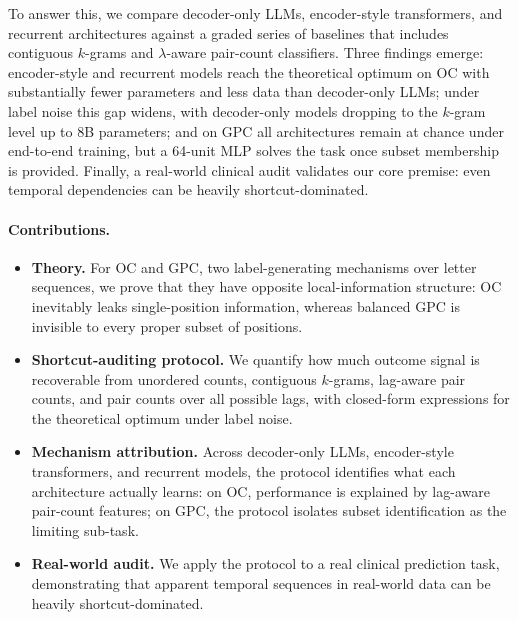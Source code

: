 \documentclass[fullpaper]{nldl}
\theoremstyle{plain}
\theoremstyle{definition}
\theoremstyle{remark}
\begin{document}
To answer this, we compare decoder-only LLMs, encoder-style transformers, and recurrent architectures against a graded series of baselines that includes contiguous $k$-grams and $\lambda$-aware pair-count classifiers. Three findings emerge: encoder-style and recurrent models reach the theoretical optimum on OC with substantially fewer parameters and less data than decoder-only LLMs; under label noise this gap widens, with decoder-only models dropping to the $k$-gram level up to 8B parameters; and on GPC all architectures remain at chance under end-to-end training, but a 64-unit MLP solves the task once subset membership is provided. Finally, a real-world clinical audit validates our core premise: even temporal dependencies can be heavily shortcut-dominated.

\paragraph{Contributions.}
\begin{itemize}[leftmargin=*,itemsep=1pt,topsep=2pt]
\item \textbf{Theory.} For OC and GPC, two label-generating mechanisms over letter sequences, we prove that they have opposite local-information structure: OC inevitably leaks single-position information, whereas balanced GPC is invisible to every proper subset of positions.
\item \textbf{Shortcut-auditing protocol.} We quantify how much outcome signal is recoverable from unordered counts, contiguous $k$-grams, lag-aware pair counts, and pair counts over all possible lags, with closed-form expressions for the theoretical optimum under label noise.
\item \textbf{Mechanism attribution.} Across decoder-only LLMs, encoder-style transformers, and recurrent models, the protocol identifies what each architecture actually learns: on OC, performance is explained by lag-aware pair-count features; on GPC, the protocol isolates subset identification as the limiting sub-task.
\item \textbf{Real-world audit.} We apply the protocol to a real clinical prediction task, demonstrating that apparent temporal sequences in real-world data can be heavily shortcut-dominated.
\end{itemize}
\end{document}
